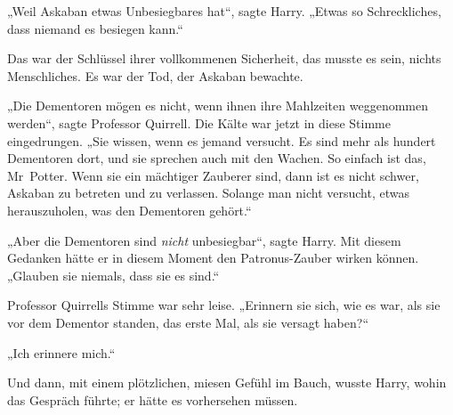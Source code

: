 „Weil Askaban etwas Unbesiegbares hat“, sagte Harry.
„Etwas so Schreckliches, dass niemand es besiegen kann.“

Das war der Schlüssel ihrer vollkommenen Sicherheit, das musste es sein, nichts Menschliches. Es war der Tod, der Askaban bewachte.

„Die Dementoren mögen es nicht, wenn ihnen ihre Mahlzeiten weggenommen werden“, sagte Professor Quirrell. Die Kälte war jetzt in diese Stimme eingedrungen.
„Sie wissen, wenn es jemand versucht. Es sind mehr als hundert Dementoren dort, und sie sprechen auch mit den Wachen. So einfach ist das, Mr~Potter. Wenn sie ein mächtiger Zauberer sind, dann ist es nicht schwer, Askaban zu betreten und zu verlassen. Solange man nicht versucht, etwas herauszuholen, was den Dementoren gehört.“

„Aber die Dementoren sind \emph{nicht} unbesiegbar“, sagte Harry. Mit diesem Gedanken hätte er in diesem Moment den Patronus-Zauber wirken können.
„Glauben sie niemals, dass sie es sind.“

Professor Quirrells Stimme war sehr leise.
„Erinnern sie sich, wie es war, als sie vor dem Dementor standen, das erste Mal, als sie versagt haben?“

„Ich erinnere mich.“

Und dann, mit einem plötzlichen, miesen Gefühl im Bauch, wusste Harry, wohin das Gespräch führte; er hätte es vorhersehen müssen.

